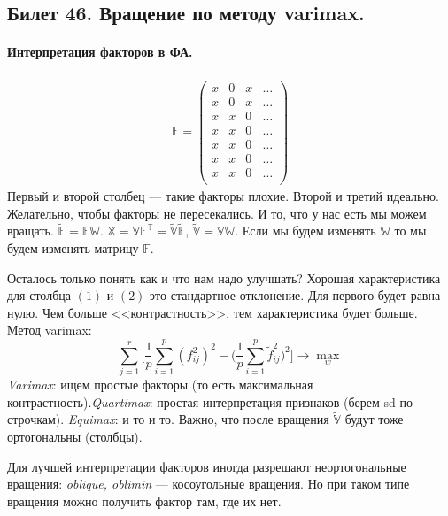 \subsection{Билет 46. Вращение по методу varimax.}
\paragraph{Интерпретация факторов в ФА.}
\begin{gather*}
    \mathbb{F} = 
    \begin{pmatrix}
        x & 0 & x & \ldots\\
        x & 0 & x & \ldots \\
        x & x & 0 & \ldots \\
        x & x & 0 & \ldots \\
        x & x & 0 & \ldots \\
        x & x & 0 & \ldots \\
        x & x & 0 & \ldots \\
    \end{pmatrix}
\end{gather*}
Первый и второй столбец --- такие факторы плохие. Второй и третий идеально. Желательно, чтобы факторы не пересекались. 
И то, что у нас есть мы можем вращать. $\mathbb{\tilde{F}} = \mathbb{F}\mathbb{W}$. $\mathbb{X} = \mathbb{V}\mathbb{F^T} = \mathbb{\tilde{V}}\mathbb{\tilde{F}}$, $\mathbb{\tilde{V}} = \mathbb{V}\mathbb{W}$. Если мы будем изменять $\mathbb{W}$ то мы будем изменять матрицу $\mathbb{F}$. 

Осталось только понять как и что нам надо улучшать? Хорошая характеристика для столбца $(1)$ и $(2)$ это стандартное отклонение.  Для первого будет равна нулю. Чем больше <<контрастность>>, тем характеристика будет больше. Метод varimax:
\begin{equation}
\sum\limits_{j = 1}^{r} \bigg[\frac{1}{p}\sum\limits_{i = 1}^{p}{(f_{ij}^2)^2} - \bigg(\frac{1}{p}\sum\limits_{i = 1}^{p}{\tilde{f}_{ij}^2}\bigg)^2\bigg] \rightarrow \max\limits_{w}
\end{equation}
\textit{Varimax}: ищем простые факторы (то есть максимальная контрастность).\textit{Quartimax}: простая интерпретация признаков (берем sd по строчкам). \textit{Equimax}: и то и то.
Важно, что после вращения $\mathbb{\tilde{V}}$ будут тоже ортогональны (столбцы). 

Для лучшей интерпретации факторов иногда разрешают неортогональные вращения: \textit{oblique, oblimin} --- косоугольные вращения. Но при таком типе вращения можно получить фактор там, где их нет. 

